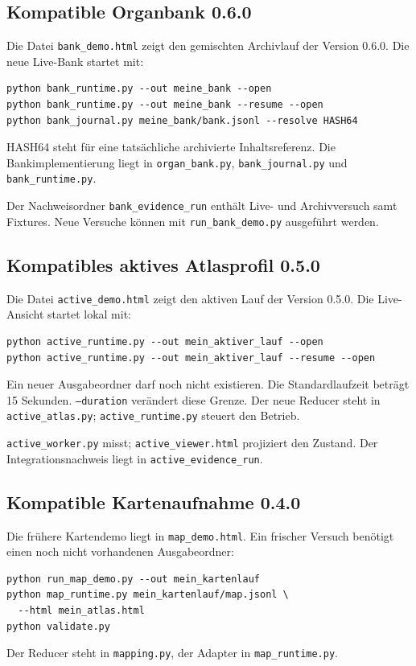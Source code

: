 \documentclass[11pt,a4paper]{article}
\begin{document}
\clearpage\subsection{Kompatible Organbank 0.6.0}
Die Datei \texttt{bank\_demo.html} zeigt den gemischten Archivlauf der Version 0.6.0.
Die neue Live-Bank startet mit:
\begin{lstlisting}
python bank_runtime.py --out meine_bank --open
python bank_runtime.py --out meine_bank --resume --open
python bank_journal.py meine_bank/bank.jsonl --resolve HASH64
\end{lstlisting}
HASH64 steht für eine tatsächliche archivierte Inhaltsreferenz.
Die Bankimplementierung liegt in \texttt{organ\_bank.py},
\texttt{bank\_journal.py} und \texttt{bank\_runtime.py}.

Der Nachweisordner \texttt{bank\_evidence\_run} enthält Live- und
Archivversuch samt Fixtures. Neue Versuche können mit
\texttt{run\_bank\_demo.py} ausgeführt werden.

\subsection{Kompatibles aktives Atlasprofil 0.5.0}
Die Datei \texttt{active\_demo.html} zeigt den aktiven Lauf der Version 0.5.0.
Die Live-Ansicht startet lokal mit:
\begin{lstlisting}
python active_runtime.py --out mein_aktiver_lauf --open
python active_runtime.py --out mein_aktiver_lauf --resume --open
\end{lstlisting}
Ein neuer Ausgabeordner darf noch nicht existieren. Die Standardlaufzeit
beträgt 15 Sekunden. \texttt{--duration} verändert diese Grenze.
Der neue Reducer steht in \texttt{active\_atlas.py};
\texttt{active\_runtime.py} steuert den Betrieb.

\texttt{active\_worker.py} misst;
\texttt{active\_viewer.html} projiziert den Zustand. Der Integrationsnachweis liegt in
\texttt{active\_evidence\_run}.

\subsection{Kompatible Kartenaufnahme 0.4.0}
Die frühere Kartendemo liegt in \texttt{map\_demo.html}.
Ein frischer Versuch benötigt einen noch nicht vorhandenen Ausgabeordner:
\begin{lstlisting}
python run_map_demo.py --out mein_kartenlauf
python map_runtime.py mein_kartenlauf/map.jsonl \
  --html mein_atlas.html
python validate.py
\end{lstlisting}
Der Reducer steht in \texttt{mapping.py}, der Adapter in
\texttt{map\_runtime.py}.
\end{document}
